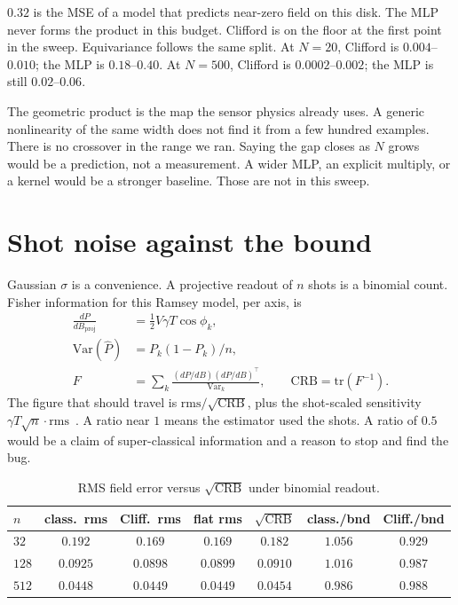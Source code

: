 \documentclass[11pt]{article}
\begin{document}
$0.32$ is the MSE of a model that predicts near-zero field on this disk.
The MLP never forms the product in this budget.
Clifford is on the floor at the first point in the sweep.
Equivariance follows the same split.
At $N=20$, Clifford is $0.004$--$0.010$; the MLP is $0.18$--$0.40$.
At $N=500$, Clifford is $0.0002$--$0.002$; the MLP is still $0.02$--$0.06$.

The geometric product is the map the sensor physics already uses.
A generic nonlinearity of the same width does not find it from a few hundred examples.
There is no crossover in the range we ran.
Saying the gap closes as $N$ grows would be a prediction, not a measurement.
A wider MLP, an explicit multiply, or a kernel would be a stronger baseline.
Those are not in this sweep.

\section{Shot noise against the bound}

Gaussian $\sigma$ is a convenience.
A projective readout of $n$ shots is a binomial count.
Fisher information for this Ramsey model, per axis, is
\begin{align}
\frac{dP}{dB_{\mathrm{proj}}}&=\tfrac12 V\gamma T\cos\phi_k,\\
\mathrm{Var}(\hat P)&=P_k(1-P_k)/n,\\
F&=\sum_k \frac{(dP/dB)(dP/dB)^\top}{\mathrm{Var}_k},\qquad
\mathrm{CRB}=\mathrm{tr}(F^{-1}).
\end{align}
The figure that should travel is $\mathrm{rms}/\sqrt{\mathrm{CRB}}$, plus the shot-scaled sensitivity $\gamma T\sqrt{n}\cdot\mathrm{rms}$~\citep{degen2017,helstrom1969}.
A ratio near $1$ means the estimator used the shots.
A ratio of $0.5$ would be a claim of super-classical information and a reason to stop and find the bug.

\begin{table}[h]
\centering
\caption{RMS field error versus $\sqrt{\mathrm{CRB}}$ under binomial readout.}
\label{tab:shots}
\begin{tabular}{lcccccc}
\toprule
$n$ & class.\ rms & Cliff.\ rms & flat rms & $\sqrt{\mathrm{CRB}}$ & class./bnd & Cliff./bnd \\
\midrule
$32$  & $0.192$  & $0.169$  & $0.169$  & $0.182$  & $1.056$ & $0.929$ \\
$128$ & $0.0925$ & $0.0898$ & $0.0899$ & $0.0910$ & $1.016$ & $0.987$ \\
$512$ & $0.0448$ & $0.0449$ & $0.0449$ & $0.0454$ & $0.986$ & $0.988$ \\
\bottomrule
\end{tabular}
\end{table}
\end{document}
